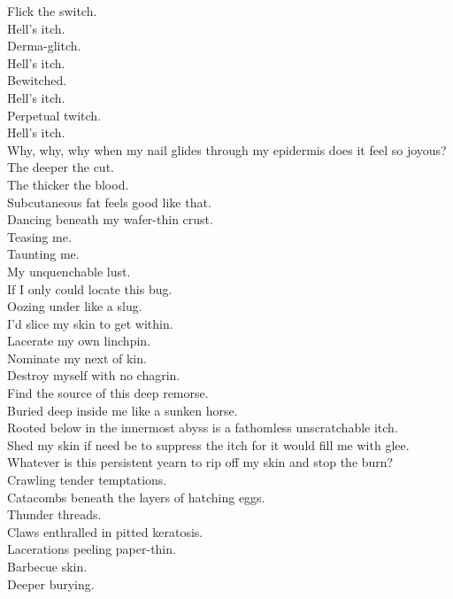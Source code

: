 


Flick the switch. \\
Hell's itch. \\
Derma-glitch. \\
Hell's itch. \\
Bewitched. \\
Hell's itch. \\
Perpetual twitch. \\
Hell's itch. \\

Why, why, why when my nail glides through my epidermis does it feel so joyous? \\
The deeper the cut. \\
The thicker the blood. \\
Subcutaneous fat feels good like that. \\
Dancing beneath my wafer-thin crust. \\
Teasing me. \\
Taunting me. \\
My unquenchable lust. \\
If I only could locate this bug. \\
Oozing under like a slug. \\
I'd slice my skin to get within. \\
Lacerate my own linchpin. \\
Nominate my next of kin. \\
Destroy myself with no chagrin. \\
Find the source of this deep remorse. \\
Buried deep inside me like a sunken horse. \\
Rooted below in the innermost abyss is a fathomless unscratchable itch. \\

Shed my skin if need be to suppress the itch for it would fill me with glee. \\
Whatever is this persistent yearn to rip off my skin and stop the burn? \\
Crawling tender temptations. \\
Catacombs beneath the layers of hatching eggs. \\
Thunder threads. \\
Claws enthralled in pitted keratosis. \\
Lacerations peeling paper-thin. \\
Barbecue skin. \\
Deeper burying. \\

